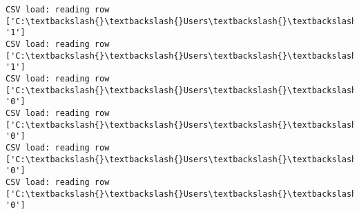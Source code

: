 \documentclass[11pt]{article}
\begin{document}
\begin{Verbatim}[commandchars=\\\{\}]
CSV load: reading row ['C:\textbackslash{}\textbackslash{}Users\textbackslash{}\textbackslash{}AbhishekGangadhar\textbackslash{}\textbackslash{}Downloads\textbackslash{}\textbackslash{}ActionRecog\textbackslash{}\textbackslash{}ActionRecog\textbackslash{}\textbackslash{}DataSets\textbackslash{}\textbackslash{}UCF11\textbackslash{}\textbackslash{}action\_youtube\_naudio\textbackslash{}\textbackslash{}golf\_swing\textbackslash{}\textbackslash{}v\_golf\_18\textbackslash{}\textbackslash{}v\_golf\_18\_05.avi', '1']
CSV load: reading row ['C:\textbackslash{}\textbackslash{}Users\textbackslash{}\textbackslash{}AbhishekGangadhar\textbackslash{}\textbackslash{}Downloads\textbackslash{}\textbackslash{}ActionRecog\textbackslash{}\textbackslash{}ActionRecog\textbackslash{}\textbackslash{}DataSets\textbackslash{}\textbackslash{}UCF11\textbackslash{}\textbackslash{}action\_youtube\_naudio\textbackslash{}\textbackslash{}golf\_swing\textbackslash{}\textbackslash{}v\_golf\_18\textbackslash{}\textbackslash{}v\_golf\_18\_06.avi', '1']
CSV load: reading row ['C:\textbackslash{}\textbackslash{}Users\textbackslash{}\textbackslash{}AbhishekGangadhar\textbackslash{}\textbackslash{}Downloads\textbackslash{}\textbackslash{}ActionRecog\textbackslash{}\textbackslash{}ActionRecog\textbackslash{}\textbackslash{}DataSets\textbackslash{}\textbackslash{}UCF11\textbackslash{}\textbackslash{}action\_youtube\_naudio\textbackslash{}\textbackslash{}biking\textbackslash{}\textbackslash{}v\_biking\_20\textbackslash{}\textbackslash{}v\_biking\_20\_01.avi', '0']
CSV load: reading row ['C:\textbackslash{}\textbackslash{}Users\textbackslash{}\textbackslash{}AbhishekGangadhar\textbackslash{}\textbackslash{}Downloads\textbackslash{}\textbackslash{}ActionRecog\textbackslash{}\textbackslash{}ActionRecog\textbackslash{}\textbackslash{}DataSets\textbackslash{}\textbackslash{}UCF11\textbackslash{}\textbackslash{}action\_youtube\_naudio\textbackslash{}\textbackslash{}biking\textbackslash{}\textbackslash{}v\_biking\_20\textbackslash{}\textbackslash{}v\_biking\_20\_02.avi', '0']
CSV load: reading row ['C:\textbackslash{}\textbackslash{}Users\textbackslash{}\textbackslash{}AbhishekGangadhar\textbackslash{}\textbackslash{}Downloads\textbackslash{}\textbackslash{}ActionRecog\textbackslash{}\textbackslash{}ActionRecog\textbackslash{}\textbackslash{}DataSets\textbackslash{}\textbackslash{}UCF11\textbackslash{}\textbackslash{}action\_youtube\_naudio\textbackslash{}\textbackslash{}biking\textbackslash{}\textbackslash{}v\_biking\_20\textbackslash{}\textbackslash{}v\_biking\_20\_03.avi', '0']
CSV load: reading row ['C:\textbackslash{}\textbackslash{}Users\textbackslash{}\textbackslash{}AbhishekGangadhar\textbackslash{}\textbackslash{}Downloads\textbackslash{}\textbackslash{}ActionRecog\textbackslash{}\textbackslash{}ActionRecog\textbackslash{}\textbackslash{}DataSets\textbackslash{}\textbackslash{}UCF11\textbackslash{}\textbackslash{}action\_youtube\_naudio\textbackslash{}\textbackslash{}biking\textbackslash{}\textbackslash{}v\_biking\_20\textbackslash{}\textbackslash{}v\_biking\_20\_04.avi', '0']

\end{Verbatim}
\end{document}
